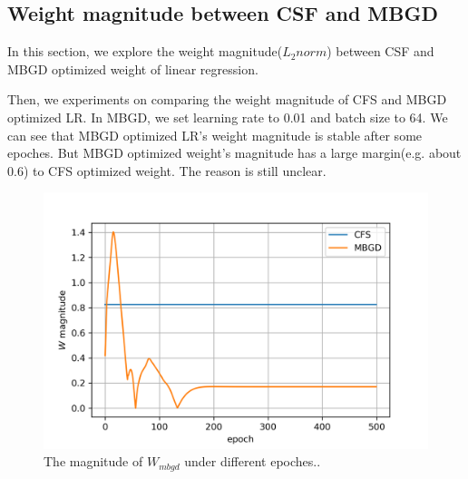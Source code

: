 \documentclass[journal, a4paper]{IEEEtran}
\begin{document}
\subsection{Weight magnitude between CSF and MBGD}
In this section, we explore the weight magnitude($L_2norm$) between CSF and MBGD optimized weight of linear regression. \par

Then, we experiments on comparing the weight magnitude of CFS and MBGD optimized LR. In MBGD, we set learning rate to 0.01 and batch size to 64. We can see that MBGD optimized LR's weight magnitude is stable after some epoches. But MBGD optimized weight's magnitude has a large margin(e.g. about 0.6) to CFS optimized weight. The reason is still unclear. \par

\begin{figure}[!hbt]
	\begin{center}
		\includegraphics[width=\columnwidth]{mbgd_w}
		\caption{The magnitude of $W_{mbgd}$ under different epoches..}
		\label{fig:mbgd_w}
	\end{center}
\end{figure} 
\end{document}
